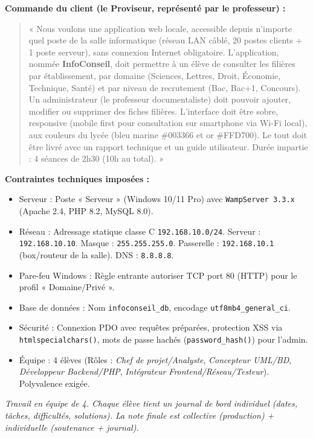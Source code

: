 \documentclass[11pt]{article}
\newcounter{popsec}
\newcounter{popsub}
\newcommand{\courssub}[1]{%
  \stepcounter{popsub}%
  \par\vspace{9pt}\noindent{\popxbold\fontsize{11.5}{13}\selectfont\color{popink}{\color{poporange}\thepopsec.\thepopsub}\hspace{6pt}#1}\par\nopagebreak\vspace{4pt}
}
\begin{document}
\vspace{0.3cm}
\noindent \textbf{Commande du client (le Proviseur, représenté par le professeur) :}
\begin{quote}
« Nous voulons une application web locale, accessible depuis n'importe quel poste de la salle informatique (réseau LAN câblé, 20 postes clients + 1 poste serveur), sans connexion Internet obligatoire. L'application, nommée \textbf{InfoConseil}, doit permettre à un élève de consulter les filières par établissement, par domaine (Sciences, Lettres, Droit, Économie, Technique, Santé) et par niveau de recrutement (Bac, Bac+1, Concours). Un administrateur (le professeur documentaliste) doit pouvoir ajouter, modifier ou supprimer des fiches filières. L'interface doit être sobre, responsive (mobile first pour consultation sur smartphone via Wi-Fi local), aux couleurs du lycée (bleu marine \#003366 et or \#FFD700). Le tout doit être livré avec un rapport technique et un guide utilisateur. Durée impartie : 4 séances de 2h30 (10h au total). »
\end{quote}

\vspace{0.3cm}
\noindent \textbf{Contraintes techniques imposées :}
\begin{itemize}
    \item Serveur : Poste « Serveur » (Windows 10/11 Pro) avec \texttt{WampServer 3.3.x} (Apache 2.4, PHP 8.2, MySQL 8.0).
    \item Réseau : Adressage statique classe C \texttt{192.168.10.0/24}. Serveur : \texttt{192.168.10.10}. Masque : \texttt{255.255.255.0}. Passerelle : \texttt{192.168.10.1} (box/routeur de la salle). DNS : \texttt{8.8.8.8}.
    \item Pare-feu Windows : Règle entrante autoriser TCP port 80 (HTTP) pour le profil « Domaine/Privé ».
    \item Base de données : Nom \texttt{infoconseil\_db}, encodage \texttt{utf8mb4\_general\_ci}.
    \item Sécurité : Connexion PDO avec requêtes préparées, protection XSS via \texttt{htmlspecialchars()}, mots de passe hachés (\texttt{password\_hash()}) pour l'admin.
    \item Équipe : 4 élèves (Rôles : \emph{Chef de projet/Analyste}, \emph{Concepteur UML/BD}, \emph{Développeur Backend/PHP}, \emph{Intégrateur Frontend/Réseau/Testeur}). Polyvalence exigée.
\end{itemize}

\courssub{Consignes}
\emph{Travail en équipe de 4. Chaque élève tient un journal de bord individuel (dates, tâches, difficultés, solutions). La note finale est collective (production) + individuelle (soutenance + journal).}
\end{document}
